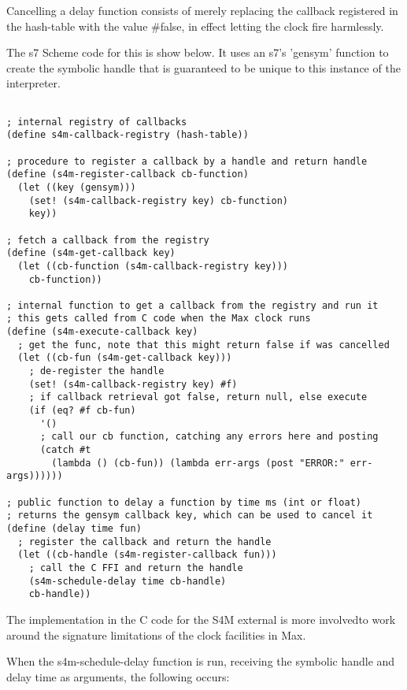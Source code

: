 \documentclass[acmsmall]{acmart}
\begin{document}
{Cancelling a delay function consists of merely replacing the callback registered
in the hash-table with the value \#false, in effect letting the clock fire harmlessly.

The s7 Scheme code for this is show below. It uses an s7's 'gensym' function to create the
symbolic handle that is guaranteed to be unique to this instance of the interpreter.

\begin{verbatim}

; internal registry of callbacks 
(define s4m-callback-registry (hash-table))

; procedure to register a callback by a handle and return handle
(define (s4m-register-callback cb-function)
  (let ((key (gensym)))
    (set! (s4m-callback-registry key) cb-function)
    key))

; fetch a callback from the registry 
(define (s4m-get-callback key)
  (let ((cb-function (s4m-callback-registry key)))
    cb-function))

; internal function to get a callback from the registry and run it
; this gets called from C code when the Max clock runs
(define (s4m-execute-callback key)
  ; get the func, note that this might return false if was cancelled
  (let ((cb-fun (s4m-get-callback key)))
    ; de-register the handle
    (set! (s4m-callback-registry key) #f)
    ; if callback retrieval got false, return null, else execute 
    (if (eq? #f cb-fun) 
      '()
      ; call our cb function, catching any errors here and posting
      (catch #t 
        (lambda () (cb-fun)) (lambda err-args (post "ERROR:" err-args))))))

; public function to delay a function by time ms (int or float)
; returns the gensym callback key, which can be used to cancel it
(define (delay time fun)
  ; register the callback and return the handle
  (let ((cb-handle (s4m-register-callback fun)))
    ; call the C FFI and return the handle
    (s4m-schedule-delay time cb-handle)
    cb-handle))

\end{verbatim}

The implementation in the C code for the S4M external is more involvedto
work around the signature limitations of the clock facilities in Max.

When the s4m-schedule-delay function is run, receiving the symbolic handle
and delay time as arguments, the following occurs:

}
\end{document}
